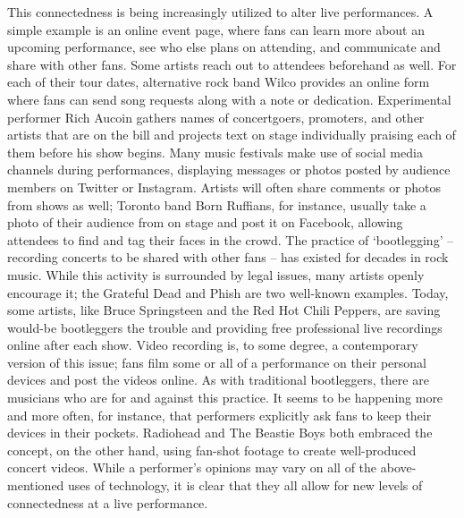 This connectedness is being increasingly utilized to alter live performances. A simple example is an online event page, where fans can learn more about an upcoming performance, see who else plans on attending, and communicate and share with other fans. Some artists reach out to attendees beforehand as well. For each of their tour dates, alternative rock band Wilco provides an online form where fans can send song requests along with a note or dedication. Experimental performer Rich Aucoin gathers names of concertgoers, promoters, and other artists that are on the bill and projects text on stage individually praising each of them before his show begins. Many music festivals make use of social media channels during performances, displaying messages or photos posted by audience members on Twitter or Instagram. Artists will often share comments or photos from shows as well; Toronto band Born Ruffians, for instance, usually take a photo of their audience from on stage and post it on Facebook, allowing attendees to find and tag their faces in the crowd. The practice of `bootlegging' -- recording concerts to be shared with other fans -- has existed for decades in rock music. While this activity is surrounded by legal issues, many artists openly encourage it; the Grateful Dead and Phish are two well-known examples. Today, some artists, like Bruce Springsteen and the Red Hot Chili Peppers, are saving would-be bootleggers the trouble and providing free professional live recordings online after each show. Video recording is, to some degree, a contemporary version of this issue; fans film some or all of a performance on their personal devices and post the videos online. As with traditional bootleggers, there are musicians who are for and against this practice. It seems to be happening more and more often, for instance, that performers explicitly ask fans to keep their devices in their pockets. Radiohead and The Beastie Boys both embraced the concept, on the other hand, using fan-shot footage to create well-produced concert videos. While a performer's opinions may vary on all of the above-mentioned uses of technology, it is clear that they all allow for new levels of connectedness at a live performance.
